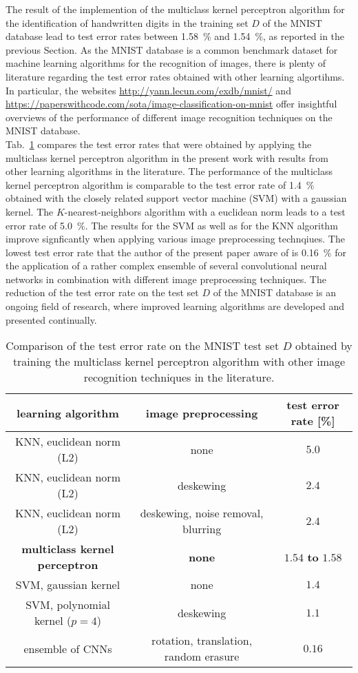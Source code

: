 The result of the implemention of the multiclass kernel perceptron algorithm for the identification of handwritten digits in the training set $D$ of the MNIST database lead to test error rates between \SI{1.58}{\percent} and \SI{1.54}{\percent}, as reported in the previous Section. As the MNIST database is a common benchmark dataset for machine learning algorithms for the recognition of images, there is plenty of literature regarding the test error rates obtained with other learning algortihms. In particular, the websites \url{http://yann.lecun.com/exdb/mnist/} and \url{https://paperswithcode.com/sota/image-classification-on-mnist} offer insightful overviews of the performance of different image recognition techniques on the MNIST database. \\

Tab.~\ref{tab:comparison} compares the test error rates that were obtained by applying the multiclass kernel perceptron algorithm in the present work with results from other learning algorithms in the literature. The performance of the multiclass kernel perceptron algorithm is comparable to the test error rate of \SI{1.4}{\percent} obtained with the closely related support vector machine (SVM) with a gaussian kernel. The $K$-nearest-neighbors algorithm with a euclidean norm leads to a test error rate of \SI{5.0}{\percent}. The results for the SVM as well as for the KNN algorithm improve signficantly when applying various image preprocessing technqiues. The lowest test error rate that the author of the present paper aware of is \SI{0.16}{\percent} for the application of a rather complex ensemble of several convolutional neural networks in combination with different image preprocessing techniques. The reduction of the test error rate on the test set $D$ of the MNIST database is an ongoing field of research, where improved learning algorithms are developed and presented continually.\\

\begin{table}
\centering
\begin{tabular}{c|c|c}
learning algorithm & image preprocessing & test error rate [\%]\\
\hline
\hline
KNN, euclidean norm (L2) & none & $5.0$\\
KNN, euclidean norm (L2) & deskewing & $2.4$\\
KNN, euclidean norm (L2) & deskewing, noise removal, blurring & $2.4$\\
\textbf{multiclass kernel perceptron} & \textbf{none} & \boldmath$1.54$ \textbf{to} \boldmath$1.58$\\ 
SVM, gaussian kernel & none & $1.4$\\
SVM, polynomial kernel ($p=4$) & deskewing & $1.1$\\
ensemble of CNNs & rotation, translation, random erasure & $0.16$
\end{tabular}
\caption{Comparison of the test error rate on the MNIST test set $D$ obtained by training the multiclass kernel perceptron algorithm with other image recognition techniques in the literature.}
\label{tab:comparison}
\end{table}

